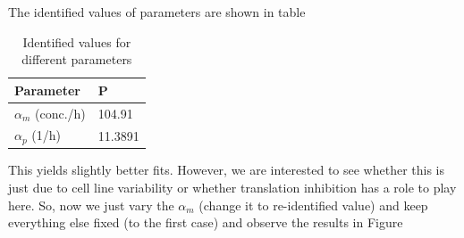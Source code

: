 \documentclass{article}
\begin{document}
The identified values of parameters are shown in table 

\begin{table}[h!]
\begin{center}
\begin{tabular}{|l|l|}
\hline
Parameter & P \\\hline
$\alpha_m$ (conc./h) &104.91\\\hline
$\alpha_p$ (1/h) &11.3891\\\hline
\end{tabular}
\end{center}
\caption{Identified values for different parameters}
\label{paramTableOpenFishUpdated}
\end{table}

This yields slightly better fits. However, we are interested to see whether this is just due to cell line variability or whether translation inhibition has a role to play here. So, now we just vary the $\alpha_m$ (change it to re-identified value) and keep everything else fixed (to the first case) and observe the results in Figure  
\end{document}
